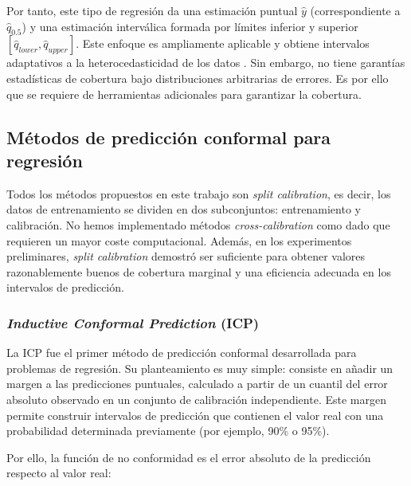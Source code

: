 Por tanto, este tipo de regresión da una estimación puntual $\hat{y}$ (correspondiente a $\hat{q}_{0.5}$) y una estimación interválica formada por límites inferior y superior $\left[ \hat{q}_{lower}, \hat{q}_{upper} \right]$. Este enfoque es ampliamente aplicable y obtiene intervalos adaptativos a la heterocedasticidad de los datos \cite{romano2019}. Sin embargo, no tiene garantías estadísticas de cobertura bajo distribuciones arbitrarias de errores. Es por ello que se requiere de herramientas adicionales para garantizar la cobertura.


\subsection{Métodos de predicción conformal para regresión}

Todos los métodos propuestos en este trabajo son \textit{split calibration}, es decir, los datos de entrenamiento se dividen en dos subconjuntos: entrenamiento y calibración. No hemos implementado métodos \textit{cross-calibration} como \cite{barber2021} dado que requieren un mayor coste computacional. Además, en los experimentos preliminares, \textit{split calibration} demostró ser suficiente para obtener valores razonablemente buenos de cobertura marginal y una eficiencia adecuada en los intervalos de predicción.


\subsubsection{\textit{Inductive Conformal Prediction} (ICP)}

La ICP \cite{papadopoulos2002} fue el primer método de predicción conformal desarrollada para problemas de regresión. Su planteamiento es muy simple: consiste en añadir un margen a las predicciones puntuales, calculado a partir de un cuantil del error absoluto observado en un conjunto de calibración independiente. Este margen permite construir intervalos de predicción que contienen el valor real con una probabilidad determinada previamente (por ejemplo, 90\% o 95\%). 

Por ello, la función de no conformidad es el error absoluto de la predicción respecto al valor real:

